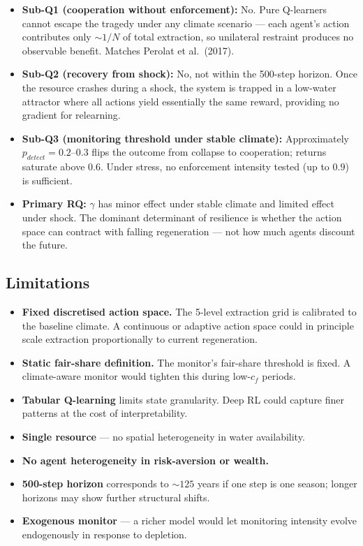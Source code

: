 \documentclass[12pt, a4paper]{article}
\begin{document}
\begin{itemize}[label=$\triangleright$]
    \item \textbf{Sub-Q1 (cooperation without enforcement):} No. Pure Q-learners cannot escape the tragedy under any climate scenario --- each agent's action contributes only ${\sim}1/N$ of total extraction, so unilateral restraint produces no observable benefit. Matches Perolat et al.\ (2017).
    \item \textbf{Sub-Q2 (recovery from shock):} No, not within the 500-step horizon. Once the resource crashes during a shock, the system is trapped in a low-water attractor where all actions yield essentially the same reward, providing no gradient for relearning.
    \item \textbf{Sub-Q3 (monitoring threshold under stable climate):} Approximately $p_{detect} = 0.2$--$0.3$ flips the outcome from collapse to cooperation; returns saturate above $0.6$. Under stress, no enforcement intensity tested (up to $0.9$) is sufficient.
    \item \textbf{Primary RQ:} $\gamma$ has minor effect under stable climate and limited effect under shock. The dominant determinant of resilience is whether the action space can contract with falling regeneration --- not how much agents discount the future.
\end{itemize}

\subsection{Limitations}

\begin{itemize}[label=$\triangleright$]
    \item \textbf{Fixed discretised action space.} The 5-level extraction grid is calibrated to the baseline climate. A continuous or adaptive action space could in principle scale extraction proportionally to current regeneration.
    \item \textbf{Static fair-share definition.} The monitor's fair-share threshold is fixed. A climate-aware monitor would tighten this during low-$c_f$ periods.
    \item \textbf{Tabular Q-learning} limits state granularity. Deep RL could capture finer patterns at the cost of interpretability.
    \item \textbf{Single resource} --- no spatial heterogeneity in water availability.
    \item \textbf{No agent heterogeneity in risk-aversion or wealth.}
    \item \textbf{500-step horizon} corresponds to ${\sim}125$ years if one step is one season; longer horizons may show further structural shifts.
    \item \textbf{Exogenous monitor} --- a richer model would let monitoring intensity evolve endogenously in response to depletion.
\end{itemize}
\end{document}
